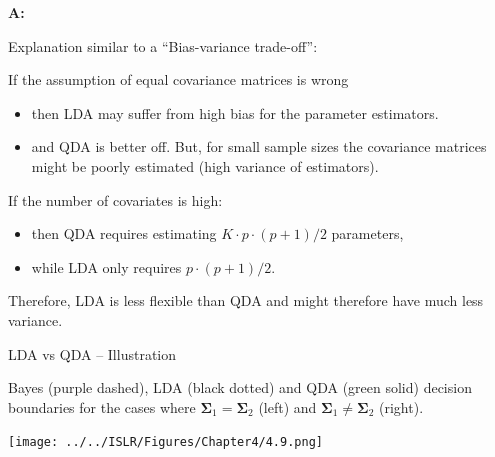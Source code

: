 \documentclass[10pt,ignorenonframetext,]{beamer}
\providecommand{\tightlist}{%
  \setlength{\itemsep}{0pt}\setlength{\parskip}{0pt}}
\begin{document}
\begin{frame}

\textbf{A:}

Explanation similar to a ``Bias-variance trade-off'':

If the assumption of equal covariance matrices is wrong

\begin{itemize}
\tightlist
\item
  then LDA may suffer from high bias for the parameter estimators.
\item
  and QDA is better off. But, for small sample sizes the covariance
  matrices might be poorly estimated (high variance of estimators).
\end{itemize}

If the number of covariates is high:

\begin{itemize}
\tightlist
\item
  then QDA requires estimating \(K\cdot p \cdot (p+1)/2\) parameters,
\item
  while LDA only requires \(p\cdot(p+1)/2\).
\end{itemize}

Therefore, LDA is less flexible than QDA and might therefore have much
less variance.

\end{frame}

\begin{frame}

\begin{block}{LDA vs QDA -- Illustration}

\vspace{1mm}

Bayes (purple dashed), LDA (black dotted) and QDA (green solid) decision
boundaries for the cases where
\(\boldsymbol{\Sigma}_1 = \boldsymbol{\Sigma}_2\) (left) and
\(\boldsymbol{\Sigma}_1 \neq \boldsymbol{\Sigma}_2\) (right).

\centering
\texttt{[image: ../../ISLR/Figures/Chapter4/4.9.png]}

\end{block}

\end{frame}
\end{document}
